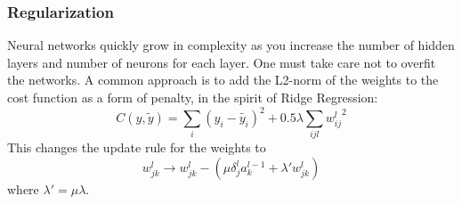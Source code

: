 \subsubsection{Regularization}

Neural networks quickly grow in complexity as you increase the number of hidden layers and number of neurons for each layer. One must take care not to overfit the networks. A common approach is to add the L2-norm of the weights to the cost function as a form of penalty, in the spirit of Ridge Regression:
\begin{equation*}
    C(y, \tilde{y}) = \sum_i(y_i - \tilde{y_i})^2 + 0.5\lambda \sum_{ijl}{w^l_{ij}}^2
\end{equation*}
This changes the update rule for the weights to
\begin{equation}\label{eq:grad step}
    w^l_{jk} \rightarrow w^l_{jk} - (\mu \delta_j^l a_k^{l-1} + \lambda'w^l_{jk}) 
\end{equation}
where $\lambda' = \mu \lambda$.
